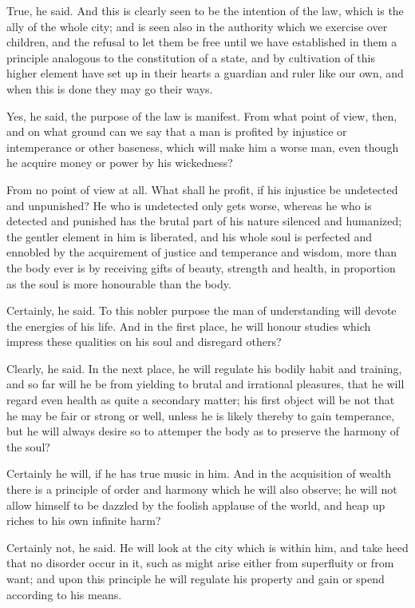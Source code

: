 True, he said.
And this is clearly seen to be the intention of the law, which is the ally of the whole city; and is seen also in the authority which we exercise over children, and the refusal to let them be free until we have established in them a principle analogous to the constitution of a state, and by cultivation of this higher element have set up in their hearts a guardian and ruler like our own, and when this is done they may go their ways.

Yes, he said, the purpose of the law is manifest.
From what point of view, then, and on what ground can we say that a man is profited by injustice or intemperance or other baseness, which will make him a worse man, even though he acquire money or power by his wickedness?

From no point of view at all.
What shall he profit, if his injustice be undetected and unpunished? He who is undetected only gets worse, whereas he who is detected and punished has the brutal part of his nature silenced and humanized; the gentler element in him is liberated, and his whole soul is perfected and ennobled by the acquirement of justice and temperance and wisdom, more than the body ever is by receiving gifts of beauty, strength and health, in proportion as the soul is more honourable than the body.

Certainly, he said.
To this nobler purpose the man of understanding will devote the energies of his life. And in the first place, he will honour studies which impress these qualities on his soul and disregard others?

Clearly, he said.
In the next place, he will regulate his bodily habit and training, and so far will he be from yielding to brutal and irrational pleasures, that he will regard even health as quite a secondary matter; his first object will be not that he may be fair or strong or well, unless he is likely thereby to gain temperance, but he will always desire so to attemper the body as to preserve the harmony of the soul?

Certainly he will, if he has true music in him.
And in the acquisition of wealth there is a principle of order and harmony which he will also observe; he will not allow himself to be dazzled by the foolish applause of the world, and heap up riches to his own infinite harm?

Certainly not, he said.
He will look at the city which is within him, and take heed that no disorder occur in it, such as might arise either from superfluity or from want; and upon this principle he will regulate his property and gain or spend according to his means.

